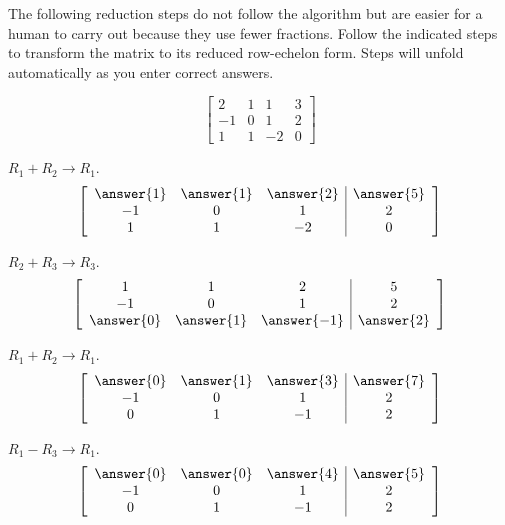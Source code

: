 \documentclass{ximera}
\begin{document}
 \begin{problem}\label{prob:twowaystorref2}
The following reduction steps do not follow the algorithm but are easier for a human to carry out because they use fewer fractions. Follow the indicated steps to transform the matrix to its reduced row-echelon form.  Steps will unfold automatically as you enter correct answers.

$$\left[\begin{array}{ccc|c}  2&1&1&3\\-1&0&1&2\\1&1&-2&0
 \end{array}\right]$$

 \begin{prompt} $R_1+R_2\rightarrow R_1$.
$$\left[\begin{array}{ccc|c}  
 \answer{1}&\answer{1}&\answer{2}&\answer{5}\\-1&0&1&2\\1&1&-2&0
 \end{array}\right]$$
\end{prompt} 

 \begin{problem}
 \begin{prompt} $R_2+R_3\rightarrow R_3$.
$$\left[\begin{array}{ccc|c}  
1&1&2&5\\-1&0&1&2\\\answer{0}&\answer{1}&\answer{-1}&\answer{2}
 \end{array}\right]$$
\end{prompt} 

 \begin{problem}
 \begin{prompt} $R_1+R_2\rightarrow R_1$.
$$\left[\begin{array}{ccc|c}  
\answer{0}&\answer{1}&\answer{3}&\answer{7}\\-1&0&1&2\\0&1&-1&2
 \end{array}\right]$$
 \end{prompt}

 \begin{problem}
 \begin{prompt} $R_1-R_3\rightarrow R_1$.
$$\left[\begin{array}{ccc|c}  
\answer{0}&\answer{0}&\answer{4}&\answer{5}\\-1&0&1&2\\0&1&-1&2
 \end{array}\right]$$
 \end{prompt}


\end{problem}
\end{problem}
\end{problem}
\end{problem}
\end{document}
